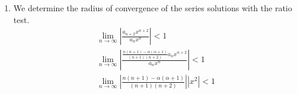 {\begin{Solution}
\begin{enumerate}
    $a_1$ are arbitrary.)
    \[
    a_n =
    \begin{cases}
      \displaystyle{
        \frac{a_0}{n!} \prod_{\substack{k=0 \\ \mathrm{even}\ k}}^{n-2} 
        \big( k (k+1) - \alpha (\alpha+1) \big),
        }
      &\mathrm{even}\ n, 
      \\
      \displaystyle{
        \frac{a_1}{n!} \prod_{\substack{k=1 \\ \mathrm{odd}\ k}}^{n-2} \big( k (k+1) - \alpha (\alpha+1) \big),
        }
      &\mathrm{odd}\ n
    \end{cases}
    \]
    We will find the fundamental set of solutions at $x = 0$, that is the set
    $\{y_1,y_2\}$ that satisfies
    \begin{alignat*}{2}
      y_1(0) &= 1 &\quad y_1'(0) &= 0 
      \\
      y_2(0) &= 0 &\quad y_2'(0) &= 1.
    \end{alignat*}
    For $y_1$ we take $a_0 = 1$ and $a_1 = 0$; for $y_2$ we take $a_0 = 0$ and
    $a_1 = 1$.  The rest of the coefficients are determined from the
    recurrence relation.
    \begin{gather*}
      \boxed{
        y_1 = \sum_{\substack{n = 0 \\ \mathrm{even}\ n}}^\infty \left( \frac{1}{n!}
          \prod_{\substack{k=0 \\ \mathrm{even}\ k}}^{n-2}
          \big( k (k+1) - \alpha (\alpha+1) \big) \right) x^n
        }
      \\
      \boxed{
        y_2 = \sum_{\substack{n = 1 \\ \mathrm{odd}\ n}}^\infty \left( \frac{1}{n!}
          \prod_{\substack{k=1 \\ \mathrm{odd}\ k}}^{n-2}
          \big( k (k+1) - \alpha (\alpha+1) \big) \right) x^n
        }
    \end{gather*}
  \item
    We determine the radius of convergence of the series solutions with the
    ratio test.
    \begin{gather*}
      \lim_{n \to \infty} \left| \frac{ a_{n+2} x^{n+2} }{ a_n x^n } \right| < 1 
      \\
      \lim_{n \to \infty} \left| \frac{ \frac{ n (n+1) - \alpha (\alpha+1) }{ (n+1)(n+2) } 
          a_n x^{n+2} }{ a_n x^n } \right| < 1 
      \\
      \lim_{n \to \infty} \left| \frac{ n (n+1) - \alpha (\alpha+1) }
        { (n+1)(n+2) } \right| \left| x^2 \right| < 1 

\end{gather*}
\end{enumerate}
\end{Solution}}
